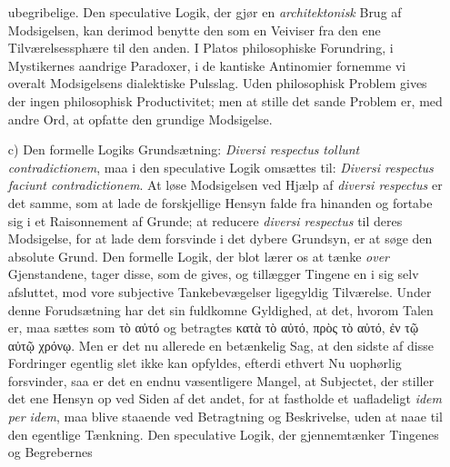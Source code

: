 \documentclass[12pt]{book}
\newcommand{\opage}[1]{\marginnote{\footnotesize\textit{[#1]}}}
\begin{document}
\begin{itemize}
  ubegribelige. Den speculative Logik, der gjør en \emph{architektonisk} Brug af
  Modsigelsen, kan derimod benytte den som en Veiviser fra den ene
  Tilværelsessphære til den anden. I Platos philosophiske Forundring, i
  Mystikernes aandrige Paradoxer, i de kantiske Antinomier fornemme vi overalt
  Modsigelsens dialektiske Pulsslag. Uden philosophisk Problem gives der ingen
  philosophisk Productivitet; men at stille det sande Problem er, med andre Ord,
  at opfatte den grundige Modsigelse.
\item[c)] Den formelle Logiks Grundsætning: \textit{Diversi respectus}
  \opage{45} \textit{tollunt contradictionem}, maa i den speculative Logik omsættes til:
  \textit{Diversi respectus faciunt contradictionem}. At løse Modsigelsen ved
  Hjælp af \textit{diversi respectus} er det samme, som at lade de forskjellige
  Hensyn falde fra hinanden og fortabe sig i et Raisonnement af Grunde; at
  reducere \textit{diversi respectus} til deres Modsigelse, for at lade dem
  forsvinde i det dybere Grundsyn, er at søge den absolute Grund. Den formelle
  Logik, der blot lærer os at tænke \emph{over} Gjenstandene, tager disse, som de
  gives, og tillægger Tingene en i sig selv afsluttet, mod vore subjective
  Tankebevægelser ligegyldig Tilværelse. Under denne Forudsætning har det sin
  fuldkomne Gyldighed, at det, hvorom Talen er, maa sættes som τὸ αὐτό og
  betragtes κατὰ τὸ αὐτό, πρὸς τὸ αὐτό, ἐν τῷ αὐτῷ χρόνῳ. Men er det nu allerede
  en betænkelig Sag, at den sidste af disse Fordringer egentlig slet ikke kan
  opfyldes, efterdi ethvert Nu uophørlig forsvinder, saa er det en endnu
  væsentligere Mangel, at Subjectet, der stiller det ene Hensyn op ved Siden af
  det andet, for at fastholde et uafladeligt \textit{idem per idem}, maa blive
  staaende ved Betragtning og Beskrivelse, uden at naae til den egentlige
  Tænkning. Den speculative Logik, der gjennemtænker Tingenes og Begrebernes

\end{itemize}
\end{document}
